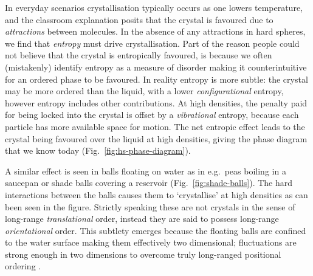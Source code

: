\documentclass[11pt,twoside]{report}
\begin{document}
In everyday scenarios crystallisation typically occurs as one lowers temperature, and the classroom explanation posits that the crystal is favoured due to \emph{attractions} between molecules.
In the absence of any attractions in hard spheres, we find that \emph{entropy} must drive crystallisation.
Part of the reason people could not believe that the crystal is entropically favoured, is because we often (mistakenly) identify entropy as a measure of disorder making it counterintuitive for an ordered phase to be favoured.
In reality entropy is more subtle: the crystal may be more ordered than the liquid, with a lower \emph{configurational} entropy, however entropy includes other contributions.
At high densities, the penalty paid for being locked into the crystal is offset by a \emph{vibrational} entropy, because each particle has more available space for motion.
The net entropic effect leads to the crystal being favoured over the liquid at high densities, giving the phase diagram that we know today (Fig.\ \ref{fig:hs-phase-diagram}).

A similar effect is seen in balls floating on water as in e.g.\ peas boiling in a saucepan or shade balls covering a reservoir (Fig.\ \ref{fig:shade-balls}).
The hard interactions between the balls causes%
them to `crystallise' at high densities as can been seen in the figure.
Strictly speaking these are not crystals in the sense of long-range \emph{translational} order, instead they are said to possess long-range \emph{orientational} order.
This subtlety emerges because the floating balls are confined to the water surface making them effectively two dimensional; fluctuations are strong enough in two dimensions to overcome truly long-ranged positional ordering \cite{MerminPRL1966,MerminPR1968}.
\end{document}
